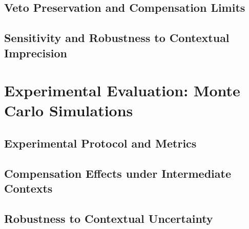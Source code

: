 \documentclass[mathematics,article,submit,moreauthors]{Definitions/mdpi}
\begin{document}
\subsection{Veto Preservation and Compensation Limits}

\subsection{Sensitivity and Robustness to Contextual Imprecision}

\section{Experimental Evaluation: Monte Carlo Simulations}

\subsection{Experimental Protocol and Metrics}

\subsection{Compensation Effects under Intermediate Contexts}

\subsection{Robustness to Contextual Uncertainty}
\end{document}
